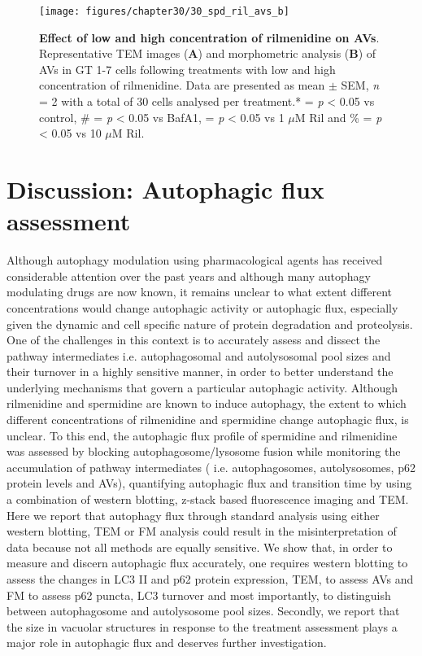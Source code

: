 {\begin{landscape}
\begin{figure}[!htbp]
\center
  \texttt{[image: figures/chapter30/30\_spd\_ril\_avs\_b]}
  \caption[Effect of low and high concentration of rilmenidine on AVs]{\textbf{Effect of low and high concentration of rilmenidine on AVs}. Representative TEM images (\textbf{A}) and morphometric analysis (\textbf{B}) of AVs in GT 1-7 cells following treatments with low and high concentration of rilmenidine. Data are presented as mean $\pm$ SEM, \textit{n} = 2 with a total of 30 cells analysed per treatment.* = \textit{p} < 0.05 vs control, \# = \textit{p} < 0.05 vs BafA1, \@ = \textit{p} < 0.05 vs 1 $\mu$M Ril and  \% = \textit{p} < 0.05 vs 10 $\mu$M Ril.}
  \label{fig:30_spd_ril_avs_b}
\end{figure} 
\end{landscape}

\section{Discussion: Autophagic flux assessment}

Although autophagy modulation using pharmacological agents has received considerable attention over the past years and although many autophagy modulating drugs are now known, it remains unclear to what extent different concentrations would change autophagic activity or autophagic flux, especially given the dynamic and cell specific nature of protein degradation and proteolysis. One of the challenges in this context is to accurately assess and dissect the pathway intermediates i.e. autophagosomal and autolysosomal pool sizes and their turnover in a highly sensitive manner, in order to better understand the underlying mechanisms that govern a particular autophagic activity. Although rilmenidine and spermidine are known to induce autophagy, the extent to which different concentrations of rilmenidine and spermidine  change  autophagic flux, is unclear. To this end, the autophagic flux profile of spermidine and rilmenidine was assessed by blocking autophagosome/lysosome fusion while monitoring the accumulation of pathway intermediates ( i.e. autophagosomes, autolysosomes, p62 protein levels and AVs), quantifying autophagic flux and transition time by using a combination of western blotting, z-stack based fluorescence imaging and TEM. Here we report that autophagy flux through standard analysis using either western blotting, TEM or FM analysis could result in the misinterpretation of data because not all methods are equally sensitive. We show that, in order to measure and discern autophagic flux accurately, one requires western blotting to assess the changes in LC3 II and p62 protein expression, TEM, to assess AVs and FM to assess p62 puncta, LC3 turnover and most importantly, to distinguish between autophagosome and autolysosome pool sizes. Secondly, we report that the size in vacuolar structures in response to the treatment assessment plays a major role in autophagic flux and deserves further investigation.

}
